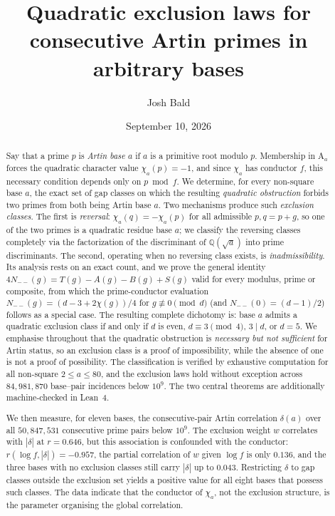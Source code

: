 \documentclass[11pt,reqno]{amsart}
\theoremstyle{plain}
\theoremstyle{definition}
\newcommand{\Art}{\mathrm{A}}
\newcommand{\Q}{\mathbb{Q}}
\begin{document}
\title[Quadratic exclusion laws for consecutive Artin primes]
{Quadratic exclusion laws for consecutive Artin primes in arbitrary bases}

\author{Josh Bald}
\address{Ontario, Canada}


\date{September 10, 2026}

\begin{abstract}
Say that a prime $p$ is \emph{Artin base $a$} if $a$ is a primitive root modulo
$p$. Membership in $\Art_a$ forces the quadratic character value
$\chi_a(p) = -1$, and since $\chi_a$ has conductor $f$, this necessary
condition depends only on $p \bmod f$. We determine, for every non-square base
$a$, the exact set of gap classes on which the resulting \emph{quadratic
obstruction} forbids two primes from both being Artin base $a$. Two mechanisms
produce such \emph{exclusion classes}. The first is \emph{reversal}:
$\chi_a(q) = -\chi_a(p)$ for all admissible $p, q = p + g$, so one of the two
primes is a quadratic residue base $a$; we classify the reversing classes
completely via the factorization of the discriminant of $\Q(\sqrt{a})$ into
prime discriminants. The second, operating when no reversing class exists, is
\emph{inadmissibility}. Its analysis rests on an exact count, and we prove the
general identity
$4 N_{--}(g) = T(g) - A(g) - B(g) + S(g)$
valid for every modulus, prime or composite, from which the prime-conductor
evaluation $N_{--}(g) = (d - 3 + 2\chi(g))/4$ for $g \not\equiv 0 \pmod d$ (and
$N_{--}(0) = (d-1)/2$) follows as a special case. The resulting complete
dichotomy is: base $a$ admits a quadratic exclusion class if and only if $d$ is
even, $d \equiv 3 \pmod 4$, $3 \mid d$, or $d = 5$. We emphasise throughout
that the quadratic obstruction is \emph{necessary but not sufficient} for
Artin status, so an exclusion class is a proof of impossibility, while the
absence of one is not a proof of possibility. The classification is verified
by exhaustive computation for all non-square $2 \le a \le 80$, and the
exclusion laws hold without exception across $84{,}981{,}870$ base--pair
incidences below $10^9$. The two central theorems are additionally
machine-checked in Lean~4.

We then measure, for eleven bases, the consecutive-pair Artin correlation
$\delta(a)$ over all $50{,}847{,}531$ consecutive prime pairs below $10^9$.
The exclusion weight $w$ correlates with $|\delta|$ at $r = 0.646$, but this
association is confounded with the conductor: $r(\log f, |\delta|) = -0.957$,
the partial correlation of $w$ given $\log f$ is only $0.136$, and the three
bases with no exclusion classes still carry $|\delta|$ up to $0.043$.
Restricting $\delta$ to gap classes outside the exclusion set yields a
positive value for all eight bases that possess such classes. The data
indicate that the conductor of $\chi_a$, not the exclusion structure, is the
parameter organising the global correlation.
\end{abstract}
\end{document}

